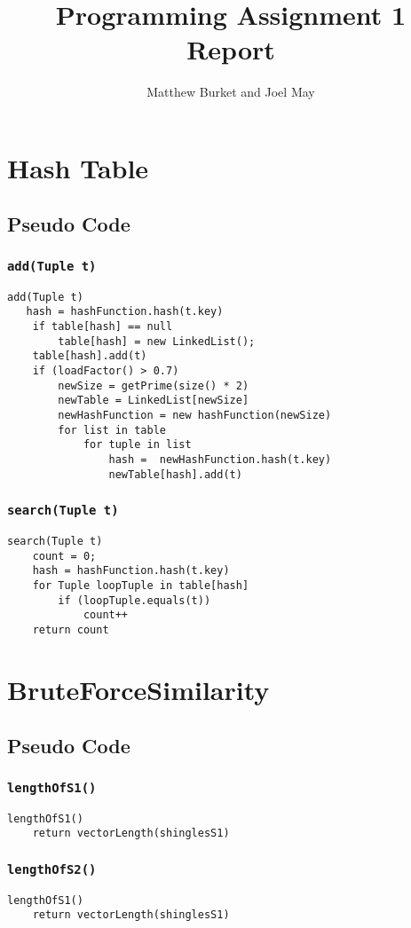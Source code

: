 \documentclass[10pt,letterpaper]{article}
\author{Matthew Burket and Joel May}
\title{Programming Assignment 1 Report}
\begin{document}
\maketitle
\section{Hash Table}
\subsection{Pseudo Code} 
\subsubsection{\texttt{add(Tuple t)}}
\begin{verbatim}
add(Tuple t)
   hash = hashFunction.hash(t.key)
    if table[hash] == null
        table[hash] = new LinkedList();
    table[hash].add(t)
    if (loadFactor() > 0.7) 
        newSize = getPrime(size() * 2)
        newTable = LinkedList[newSize]
        newHashFunction = new hashFunction(newSize)
        for list in table
            for tuple in list
                hash =  newHashFunction.hash(t.key)
                newTable[hash].add(t)
\end{verbatim}
\subsubsection{\texttt{search(Tuple t)}}
\begin{verbatim}
search(Tuple t) 
    count = 0;
    hash = hashFunction.hash(t.key)
    for Tuple loopTuple in table[hash]
        if (loopTuple.equals(t))
            count++
    return count
\end{verbatim}
\section{BruteForceSimilarity}
\subsection{Pseudo Code}
\subsubsection{\texttt{lengthOfS1()}}
\begin{verbatim}
lengthOfS1()
    return vectorLength(shinglesS1)
\end{verbatim}
\subsubsection{\texttt{lengthOfS2()}}
\begin{verbatim}
lengthOfS1()
    return vectorLength(shinglesS1)
\end{verbatim}
\end{document}
